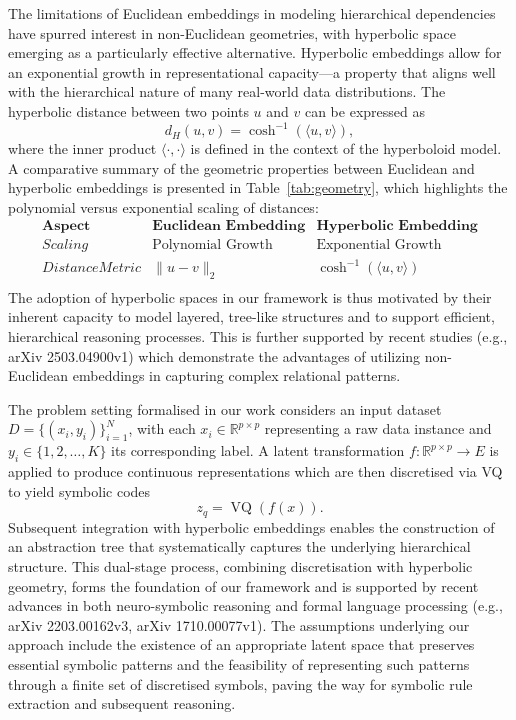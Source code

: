\documentclass{article}
\begin{document}
The limitations of Euclidean embeddings in modeling hierarchical dependencies have spurred interest in non-Euclidean geometries, with hyperbolic space emerging as a particularly effective alternative. Hyperbolic embeddings allow for an exponential growth in representational capacity—a property that aligns well with the hierarchical nature of many real-world data distributions. The hyperbolic distance between two points \( u \) and \( v \) can be expressed as
\[
d_{H}(u,v) = \cosh^{-1}(\langle u,v \rangle),
\]
where the inner product \( \langle \cdot,\cdot \rangle \) is defined in the context of the hyperboloid model. A comparative summary of the geometric properties between Euclidean and hyperbolic embeddings is presented in Table~\ref{tab:geometry}, which highlights the polynomial versus exponential scaling of distances:
\[
\begin{array}{l|c|c}
\textbf{Aspect} & \textbf{Euclidean Embedding} & \textbf{Hyperbolic Embedding} \\ \hline
Scaling & \text{Polynomial Growth} & \text{Exponential Growth} \\
Distance Metric & \|u - v\|_2 & \cosh^{-1}(\langle u,v \rangle) \\
\end{array}
\]
The adoption of hyperbolic spaces in our framework is thus motivated by their inherent capacity to model layered, tree-like structures and to support efficient, hierarchical reasoning processes. This is further supported by recent studies (e.g., arXiv 2503.04900v1) which demonstrate the advantages of utilizing non-Euclidean embeddings in capturing complex relational patterns.

The problem setting formalised in our work considers an input dataset \( D = \{(x_i, y_i)\}_{i=1}^N \), with each \( x_i \in \mathbb{R}^{p \times p} \) representing a raw data instance and \( y_i \in \{1,2,\ldots, K\} \) its corresponding label. A latent transformation \( f : \mathbb{R}^{p \times p} \to E \) is applied to produce continuous representations which are then discretised via VQ to yield symbolic codes
\[
z_q = \operatorname{VQ}(f(x)).
\]
Subsequent integration with hyperbolic embeddings enables the construction of an abstraction tree that systematically captures the underlying hierarchical structure. This dual-stage process, combining discretisation with hyperbolic geometry, forms the foundation of our framework and is supported by recent advances in both neuro-symbolic reasoning and formal language processing (e.g., arXiv 2203.00162v3, arXiv 1710.00077v1). The assumptions underlying our approach include the existence of an appropriate latent space that preserves essential symbolic patterns and the feasibility of representing such patterns through a finite set of discretised symbols, paving the way for symbolic rule extraction and subsequent reasoning.
\end{document}
